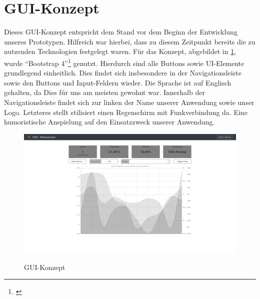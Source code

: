 

\section{GUI-Konzept}\label{GUI-Konzept}

Dieses GUI-Konzept entspricht dem Stand vor dem Beginn der Entwicklung unseres Prototypen.
Hilfreich war hierbei, dass zu diesem Zeitpunkt bereits die zu nutzenden Technologien festgelegt waren.
Für das Konzept, abgebildet in \cref{fig:gui-konzept}, wurde \enquote{Bootstrap 4}\footnote{\cite{bootstrap}} genutzt.
Hierdurch sind alle Buttons sowie UI-Elemente grundlegend einheitlich.
Dies findet sich insbesondere in der Navigationsleiste sowie den Buttons und Input-Feldern wieder.
Die Sprache ist auf Englisch gehalten, da Dies für uns am meisten gewohnt war.
Innerhalb der Navigationsleiste findet sich zur linken der Name unserer Anwendung sowie unser Logo.
Letzteres stellt stilisiert einen Regenschirm mit Funkverbindung da.
Eine humoristische Anspielung auf den Einsatzzweck unserer Anwendung.

\begin{figure}[h!!]
    \centering
    \begin{minipage}[t]{1\textwidth}
        \caption{GUI-Konzept}
        \includegraphics[width=1\textwidth]{img/gui-konzept.png}\\
        \label{fig:gui-konzept}
    \end{minipage}
\end{figure}

